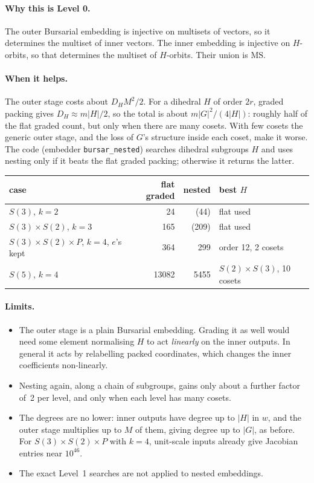 \documentclass[11pt]{article}
\theoremstyle{definition}
\theoremstyle{remark}
\newcommand{\MS}{\mathrm{MS}}
\begin{document}
\paragraph{Why this is Level 0.}
The outer Bursarial embedding is injective on multisets of vectors, so it
determines the multiset of inner vectors. The inner embedding is injective on
$H$-orbits, so that determines the multiset of $H$-orbits. Their union is $\MS$.

\paragraph{When it helps.}
The outer stage costs about $D_H M^2 / 2$. For a dihedral $H$ of order $2r$,
graded packing gives $D_H \approx m |H| / 2$, so the total is about
$m |G|^2 / (4|H|)$: roughly half of the flat graded count, but only when there
are many cosets. With few cosets the generic outer stage, and the loss of
$G$'s structure inside each coset, make it worse. The code (embedder
\texttt{bursar\_nested}) searches dihedral subgroups $H$ and uses nesting only
if it beats the flat graded packing; otherwise it returns the latter.
\begin{center}
\small
\begin{tabular}{lrrl}
  case & flat graded & nested & best $H$ \\ \hline
  $S(3)$, $k = 2$                                & 24    & (44)  & flat used \\
  $S(3)\times S(2)$, $k = 3$                     & 165   & (209) & flat used \\
  $S(3)\times S(2)\times P$, $k = 4$, $e$'s kept & 364   & 299   & order 12, 2 cosets \\
  $S(5)$, $k = 4$                                & 13082 & 5455  & $S(2)\times S(3)$, 10 cosets
\end{tabular}
\end{center}

\paragraph{Limits.}
\begin{itemize}
  \item The outer stage is a plain Bursarial embedding. Grading it as well
    would need some element normalising $H$ to act \emph{linearly} on the
    inner outputs. In general it acts by relabelling packed coordinates, which
    changes the inner coefficients non-linearly.
  \item Nesting again, along a chain of subgroups, gains only about a further
    factor of~2 per level, and only when each level has many cosets.
  \item The degrees are no lower: inner outputs have degree up to $|H|$ in
    $w$, and the outer stage multiplies up to $M$ of them, giving degree up to
    $|G|$, as before. For $S(3)\times S(2)\times P$ with $k = 4$, unit-scale inputs
    already give Jacobian entries near $10^{46}$.
  \item The exact Level~1 searches are not applied to nested embeddings.
\end{itemize}
\end{document}

